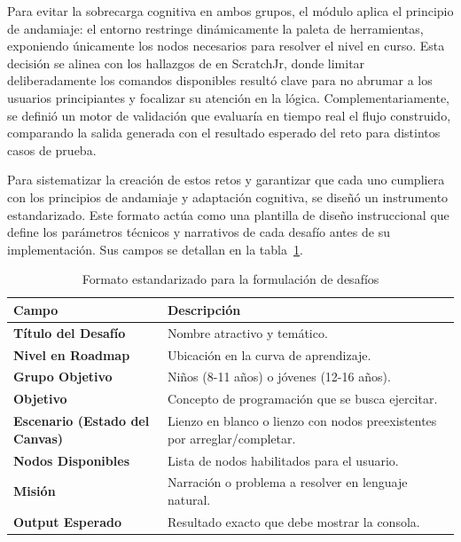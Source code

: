 Para evitar la sobrecarga cognitiva en ambos grupos, el módulo aplica el principio de andamiaje: el entorno restringe dinámicamente la paleta de herramientas, exponiendo únicamente los nodos necesarios para resolver el nivel en curso. Esta decisión se alinea con los hallazgos de  en ScratchJr, donde limitar deliberadamente los comandos disponibles resultó clave para no abrumar a los usuarios principiantes y focalizar su atención en la lógica. Complementariamente, se definió un motor de validación que evaluaría en tiempo real el flujo construido, comparando la salida generada con el resultado esperado del reto para distintos casos de prueba.

Para sistematizar la creación de estos retos y garantizar que cada uno cumpliera con los principios de andamiaje y adaptación cognitiva, se diseñó un instrumento estandarizado. Este formato actúa como una plantilla de diseño instruccional que define los parámetros técnicos y narrativos de cada desafío antes de su implementación. Sus campos se detallan en la tabla~\ref{tab:formato-desafios}.

\begin{table}[H]
    \centering
    \caption{Formato estandarizado para la formulación de desafíos}
    \label{tab:formato-desafios}
    \begingroup
    \renewcommand{\arraystretch}{\TableRowStretch}
    \renewcommand{\TableBodyFontSize}{\footnotesize}
    \begin{tabularx}{\textwidth}{ l X }
        \hline
        \textbf{Campo} & \textbf{Descripción} \\
        \hline
        \textbf{Título del Desafío} & Nombre atractivo y temático. \\
        \textbf{Nivel en Roadmap} & Ubicación en la curva de aprendizaje. \\
        \textbf{Grupo Objetivo} & Niños (8-11 años) o jóvenes (12-16 años). \\
        \textbf{Objetivo} & Concepto de programación que se busca ejercitar. \\
        \textbf{Escenario (Estado del Canvas)} & Lienzo en blanco o lienzo con nodos preexistentes por arreglar/completar. \\
        \textbf{Nodos Disponibles} & Lista de nodos habilitados para el usuario. \\
        \textbf{Misión} & Narración o problema a resolver en lenguaje natural. \\
        \textbf{Output Esperado} & Resultado exacto que debe mostrar la consola. \\
        \hline
    \end{tabularx}
    \endgroup
\end{table}

